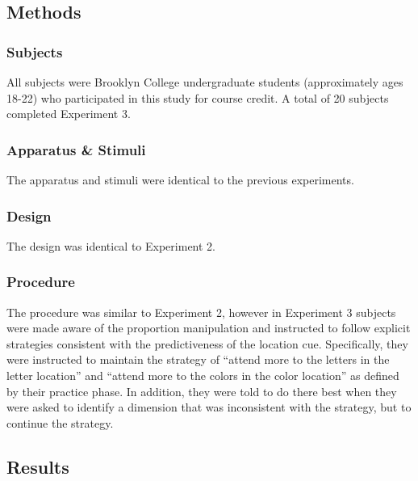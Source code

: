 \documentclass[english,,man,floatsintext]{apa6}
\begin{document}
\subsection{Methods}\label{methods-2}

\subsubsection{Subjects}\label{subjects-2}

All subjects were Brooklyn College undergraduate students (approximately
ages 18-22) who participated in this study for course credit. A total of
20 subjects completed Experiment 3.

\subsubsection{Apparatus \& Stimuli}\label{apparatus-stimuli-2}

The apparatus and stimuli were identical to the previous experiments.

\subsubsection{Design}\label{design-2}

The design was identical to Experiment 2.

\subsubsection{Procedure}\label{procedure-2}

The procedure was similar to Experiment 2, however in Experiment 3
subjects were made aware of the proportion manipulation and instructed
to follow explicit strategies consistent with the predictiveness of the
location cue. Specifically, they were instructed to maintain the
strategy of \enquote{attend more to the letters in the letter location}
and \enquote{attend more to the colors in the color location} as defined
by their practice phase. In addition, they were told to do there best
when they were asked to identify a dimension that was inconsistent with
the strategy, but to continue the strategy.

\subsection{Results}\label{results-2}
\end{document}
